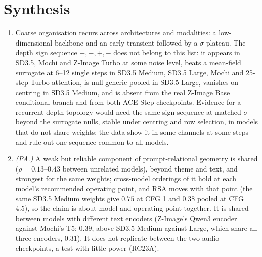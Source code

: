\documentclass[11pt]{article}
\begin{document}
\section{Synthesis}\label{sec:synthesis}
\begin{enumerate}
 \item Coarse organisation recurs across architectures and modalities: a low-dimensional backbone and an early transient followed by a $\sigma$-plateau. The depth sign sequence $+,-,+,-$ does not belong to this list: it appears in SD3.5, Mochi and Z-Image Turbo at some noise level, beats a mean-field surrogate at 6--12 single steps in SD3.5 Medium, SD3.5 Large, Mochi and 25-step Turbo attention, is null-generic pooled in SD3.5 Large, vanishes on centring in SD3.5 Medium, and is absent from the real Z-Image Base conditional branch and from both ACE-Step checkpoints. Evidence for a recurrent depth topology would need the same sign sequence at matched $\sigma$ beyond the surrogate nulls, stable under centring and row selection, in models that do not share weights; the data show it in some channels at some steps and rule out one sequence common to all models.
 \item \emph{(PA.)} A weak but reliable component of prompt-relational geometry is shared ($\rho=0.13$--$0.43$ between unrelated models), beyond theme and text, and strongest for the same weights; cross-model orderings of it hold at each model's recommended operating point, and RSA moves with that point (the same SD3.5 Medium weights give $0.75$ at CFG 1 and $0.38$ pooled at CFG 4.5), so the claim is about model and operating point together. It is shared between models with different text encoders (Z-Image's Qwen3 encoder against Mochi's T5: $0.39$, above SD3.5 Medium against Large, which share all three encoders, $0.31$). It does not replicate between the two audio checkpoints, a test with little power (RC23A).

\end{enumerate}
\end{document}
